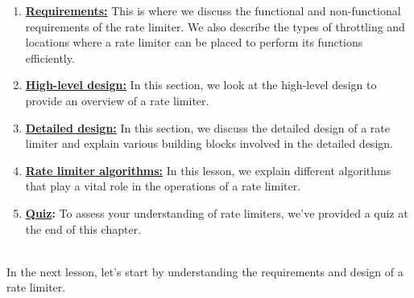 \begin{enumerate}
\item
\protect{}\label{h3K4yR6eE8shEZqgr3Ck9}
\href{https://www.educative.io/courses/grokking-the-system-design-interview/requirements-of-a-rate-limiters-design}{\textbf{Requirements:}} This is where we discuss the functional and non-functional requirements of the rate limiter. We also describe the types of throttling and locations where a rate limiter can be placed to perform its functions efficiently.
\item
\protect{}\label{WpK_1_9HwDyBDgUbz-9mi}
\href{https://www.educative.io/courses/grokking-the-system-design-interview/design-of-a-rate-limiter}{\textbf{High-level design:}} In this section, we look at the high-level design to provide an overview of a rate limiter.
\item
\protect{}\label{0Pg3Zqcu9W4IGfKvKDBLc}
\href{https://www.educative.io/courses/grokking-the-system-design-interview/design-of-a-rate-limiter\#Detailed-design}{\textbf{Detailed design:}} In this section, we discuss the detailed design of a rate limiter and explain various building blocks involved in the detailed design.
\item
\protect{}\label{h8uuI1SAnB5HdFOQf2xCm}
\href{https://www.educative.io/courses/grokking-the-system-design-interview/rate-limiter-algorithms}{\textbf{Rate limiter algorithms:}} In this lesson, we explain different algorithms that play a vital role in the operations of a rate limiter.
\item
\protect{}\label{exFvNzQltEkiIFKlUS0Uw}
\href{https://www.educative.io/courses/grokking-the-system-design-interview/quiz-on-the-rate-limiters-design}{\textbf{Quiz}}\textbf{:} To assess your understanding of rate limiters, we've provided a quiz at the end of this chapter.
\end{enumerate}
\\
In the next lesson, let's start by understanding the requirements and design of a rate limiter.

